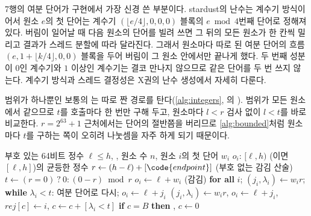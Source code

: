 7행의 여분 단어가 구현에서 가장 신경 쓴 부분이다. stardust의 난수는 계수기 방식이어서 원소 $e$의 첫 단어는 계수기 $(\lfloor e/4\rfloor,0,0,0)$ 블록의 $e\bmod4$번째 단어로 정해져 있다. 버림이 일어날 때 다음 원소의 단어를 빌려 쓰면 그 뒤의 모든 원소가 한 칸씩 밀리고 결과가 스레드 분할에 따라 달라진다. 그래서 원소마다 따로 된 여분 단어의 흐름 $(e,1+\lfloor k/4\rfloor,0,0)$ 블록을 두어 버림이 그 원소 안에서만 끝나게 했다. 두 번째 성분이 $0$인 계수기와 $1$ 이상인 계수기는 결코 만나지 않으므로 같은 단어를 두 번 쓰지 않는다. 계수기 방식과 스레드 결정성은 X권의 난수 생성에서 자세히 다룬다.

범위가 하나뿐인 보통의 는 따로 짠 경로를 탄다(\cref{alg:integers}, 의 ). 범위가 모든 원소에서 같으므로 $t$를 호출마다 한 번만 구해 두고, 원소마다 $l<r$ 검사 없이 $l<t$를 바로 비교한다. $r=2^{63}+1$ 근처에서는 단어의 절반쯤을 버리므로 \cref{alg:bounded}처럼 원소마다 $t$를 구하는 쪽이 오히려 나눗셈을 자주 하게 되기 때문이다.

\begin{algorithm}[htbp]
\begin{algorithmic}[1]
\Require 부호 있는 64비트 정수 $\ell\le h$, , 원소 수 $n$, 원소 $i$의 첫 단어 $w_i$
\Ensure $o_i$: $[\ell,h)$ (이면 $[\ell,h]$)의 균등한 정수
\State $r\gets(h-\ell)+[\code{endpoint}]$ (부호 없는 감김 산술) 
\State $t\gets(r=0)\ ?\ 0:(0-r)\bmod r$ 
 $o_i\gets\ell+w_i$ (감김) \textbf{for all} $i$; \Return
\EndIf
{} 
   $(j_i,\lambda_i)\gets w_ir$; \textbf{while} $\lambda_i<t$: 여분 단어로 다시; $o_i\gets\ell+j_i$
  \EndFor
\Else {}
    \State $(j_i,\lambda_i)\gets w_ir$, $o_i\gets\ell+j_i$, $\mathit{rej}[c]\gets i$, $c\gets c+[\lambda_i<t]$
    \State \textbf{if} $c=B$ \textbf{then} , $c\gets0$
  \EndFor
  \State {} 
\EndIf
\end{algorithmic}
\caption{범위가 하나인  (stardust)}
\label{alg:integers}
\end{algorithm}

